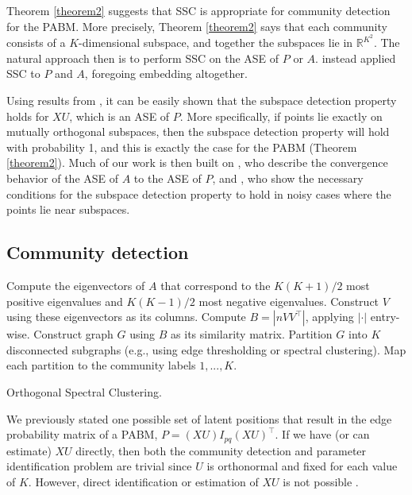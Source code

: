 \documentclass[
  12pt,
]{article}
\begin{document}
Theorem \ref{theorem2} suggests that SSC is appropriate for community
detection for the PABM. More precisely, Theorem \ref{theorem2} says that
each community consists of a \(K\)-dimensional subspace, and together
the subspaces lie in \(\mathbb{R}^{K^2}\). The natural approach then is
to perform SSC on the ASE of \(P\) or \(A\).
\citeauthor{noroozi2019estimation} instead applied SSC to \(P\) and
\(A\), foregoing embedding altogether.

Using results from \citet{soltanolkotabi2012}, it can be easily shown
that the subspace detection property holds for \(XU\), which is an ASE
of \(P\). More specifically, if points lie exactly on mutually
orthogonal subspaces, then the subspace detection property will hold
with probability 1, and this is exactly the case for the PABM (Theorem
\ref{theorem2}). Much of our work is then built on
\citeauthor{rubindelanchy2017statistical}, who describe the convergence
behavior of the ASE of \(A\) to the ASE of \(P\), and
\citet{jmlr-v28-wang13}, who show the necessary conditions for the
subspace detection property to hold in noisy cases where the points lie
near subspaces.

\hypertarget{community-detection}{%
\subsection{Community detection}\label{community-detection}}

\begin{algorithm}[t]
  \DontPrintSemicolon
  \SetAlgoLined
    Compute the eigenvectors of $A$ that correspond to the $K (K+1) / 2$ most 
    positive eigenvalues and $K (K-1) / 2$ most negative eigenvalues. Construct 
    $V$ using these eigenvectors as its columns.\;
    Compute $B = |n V V^\top|$, applying $|\cdot|$ entry-wise.\;
    Construct graph $G$ using $B$ as its similarity matrix.\;
    Partition $G$ into $K$ disconnected subgraphs  
    (e.g., using edge thresholding or spectral clustering).\;
    Map each partition to the community labels $1, ..., K$.\;
  \caption{Orthogonal Spectral Clustering.}
\end{algorithm}

We previously stated one possible set of latent positions that result in
the edge probability matrix of a PABM, \(P = (XU) I_{pq} (XU)^\top\). If
we have (or can estimate) \(XU\) directly, then both the community
detection and parameter identification problem are trivial since \(U\)
is orthonormal and fixed for each value of \(K\). However, direct
identification or estimation of \(XU\) is not possible
\cite{rubindelanchy2017statistical}.
\end{document}
